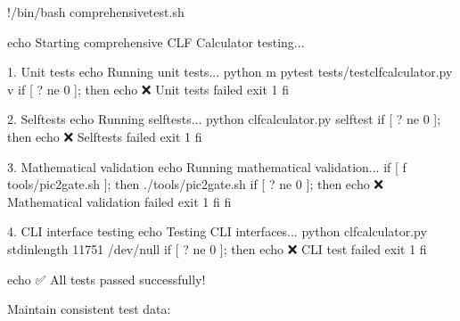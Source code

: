 \documentclass[letterpaper,10pt,english]{sphinxmanual}
\begin{document}
\begin{sphinxVerbatim}[commandchars=\\\{\}]
\PYGZsh{}!/bin/bash
\PYGZsh{} comprehensive\PYGZus{}test.sh

echo \PYGZdq{}Starting comprehensive CLF Calculator testing...\PYGZdq{}

\PYGZsh{} 1. Unit tests
echo \PYGZdq{}Running unit tests...\PYGZdq{}
python \PYGZhy{}m pytest tests/test\PYGZus{}clf\PYGZus{}calculator.py \PYGZhy{}v
if [ \PYGZdl{}? \PYGZhy{}ne 0 ]; then
    echo \PYGZdq{}❌ Unit tests failed\PYGZdq{}
    exit 1
fi

\PYGZsh{} 2. Self\PYGZhy{}tests
echo \PYGZdq{}Running self\PYGZhy{}tests...\PYGZdq{}
python clf\PYGZus{}calculator.py \PYGZhy{}\PYGZhy{}self\PYGZhy{}test
if [ \PYGZdl{}? \PYGZhy{}ne 0 ]; then
    echo \PYGZdq{}❌ Self\PYGZhy{}tests failed\PYGZdq{}
    exit 1
fi

\PYGZsh{} 3. Mathematical validation
echo \PYGZdq{}Running mathematical validation...\PYGZdq{}
if [ \PYGZhy{}f \PYGZdq{}tools/pic2\PYGZus{}gate.sh\PYGZdq{} ]; then
    ./tools/pic2\PYGZus{}gate.sh
    if [ \PYGZdl{}? \PYGZhy{}ne 0 ]; then
        echo \PYGZdq{}❌ Mathematical validation failed\PYGZdq{}
        exit 1
    fi
fi

\PYGZsh{} 4. CLI interface testing
echo \PYGZdq{}Testing CLI interfaces...\PYGZdq{}
python clf\PYGZus{}calculator.py \PYGZhy{}\PYGZhy{}stdin\PYGZhy{}length 11751 \PYGZgt{} /dev/null
if [ \PYGZdl{}? \PYGZhy{}ne 0 ]; then
    echo \PYGZdq{}❌ CLI test failed\PYGZdq{}
    exit 1
fi

echo \PYGZdq{}✅ All tests passed successfully!\PYGZdq{}
\end{sphinxVerbatim}

\sphinxAtStartPar
{}

\sphinxAtStartPar
Maintain consistent test data:
\end{document}
